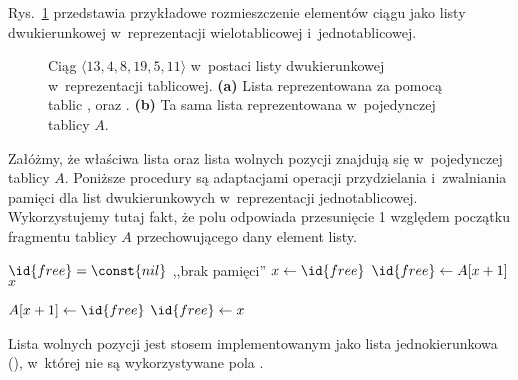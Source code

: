 
\exercise %

\noindent Rys.\ \ref{fig:10.3-1} przedstawia przykładowe rozmieszczenie elementów ciągu jako listy dwukierunkowej w~reprezentacji wielotablicowej i~jednotablicowej.
\begin{figure}[!ht]
	\centering 
	\caption{Ciąg $\langle13,4,8,19,5,11\rangle$ w~postaci listy dwukierunkowej w~reprezentacji tablicowej.
{\sffamily\bfseries(a)} Lista reprezentowana za pomocą tablic ,  oraz .
{\sffamily\bfseries(b)} Ta sama lista reprezentowana w~pojedynczej tablicy $A$.} \label{fig:10.3-1}
\end{figure}

\exercise %
Załóżmy, że właściwa lista oraz lista wolnych pozycji znajdują się w~pojedynczej tablicy $A$.
Poniższe procedury są adaptacjami operacji przydzielania i~zwalniania pamięci dla list dwukierunkowych w~reprezentacji jednotablicowej.
Wykorzystujemy tutaj fakt, że polu  odpowiada przesunięcie 1 względem początku fragmentu tablicy $A$ przechowującego dany element listy.
\begin{codebox}
\li	\If $\id{free}=\const{nil}$
\li		\Then \Error ,,brak pamięci''
		\End
\li	$x\gets\id{free}$
\li	$\id{free}\gets A[x+1]$
\li	\Return $x$
\end{codebox}

\begin{codebox}
\li	$A[x+1]\gets\id{free}$
\li	$\id{free}\gets x$
\end{codebox}

\exercise %
Lista wolnych pozycji jest stosem implementowanym jako lista jednokierunkowa (), w~której nie są wykorzystywane pola .


